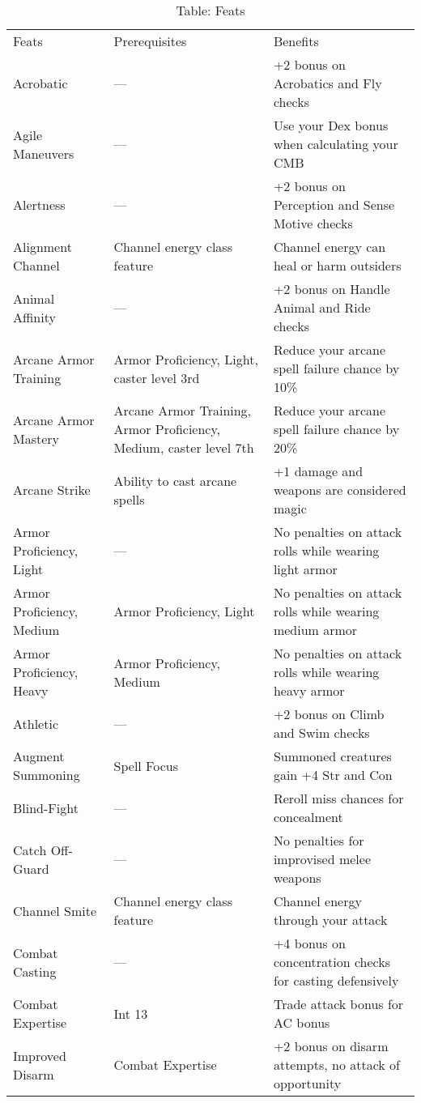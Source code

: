 \begin{table*}[]
\sffamily
\setlength{\tabcolsep}{1pt}
\caption{Table: Feats}
\fontsize{9.5}{11.4}\selectfont
\begin{tabularx}{\linewidth}{lXl}
Feats & Prerequisites & Benefits\\
Acrobatic & --- & +2 bonus on Acrobatics and Fly checks \\
Agile Maneuvers & --- & Use your Dex bonus when calculating your CMB \\
Alertness & --- & +2 bonus on Perception and Sense Motive checks\\
Alignment Channel & Channel energy class feature & Channel energy can heal or harm outsiders\\
Animal Affinity & --- & +2 bonus on Handle Animal and Ride checks\\
Arcane Armor Training & Armor Proficiency, Light, caster level 3rd & Reduce your arcane spell failure chance by 10\%\\
\enspace Arcane Armor Mastery & Arcane Armor Training, Armor Proficiency, Medium, caster level 7th & Reduce your arcane spell failure chance by 20\%\\
Arcane Strike & Ability to cast arcane spells & +1 damage and weapons are considered magic\\
Armor Proficiency, Light & --- & No penalties on attack rolls while wearing light armor\\
\enspace Armor Proficiency, Medium & Armor Proficiency, Light & No penalties on attack rolls while wearing medium armor\\
\enspace \enspace Armor Proficiency, Heavy & Armor Proficiency, Medium & No penalties on attack rolls while wearing heavy armor\\
Athletic & --- & +2 bonus on Climb and Swim checks\\
Augment Summoning & Spell Focus & Summoned creatures gain +4 Str and Con\\
Blind-Fight & --- & Reroll miss chances for concealment\\
Catch Off-Guard & --- & No penalties for improvised melee weapons\\
Channel Smite & Channel energy class feature & Channel energy through your attack\\
Combat Casting & --- & +4 bonus on concentration checks for casting defensively\\
Combat Expertise & Int 13 & Trade attack bonus for AC bonus\\
\enspace Improved Disarm & Combat Expertise & +2 bonus on disarm attempts, no attack of opportunity\\

\end{tabularx}
\end{table*}
